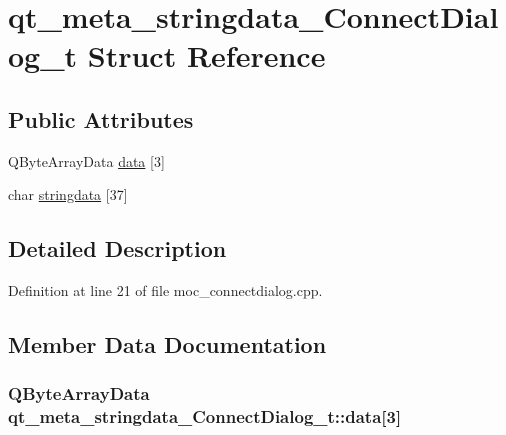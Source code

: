\hypertarget{structqt__meta__stringdata___connect_dialog__t}{}\section{qt\+\_\+meta\+\_\+stringdata\+\_\+\+Connect\+Dialog\+\_\+t Struct Reference}
\label{structqt__meta__stringdata___connect_dialog__t}
\subsection*{Public Attributes}
\begin{DoxyCompactItemize}
\item 
Q\+Byte\+Array\+Data \hyperlink{structqt__meta__stringdata___connect_dialog__t_a229ce996e8ad04acc64a1eccd45d92e9}{data} \mbox{[}3\mbox{]}
\item 
char \hyperlink{structqt__meta__stringdata___connect_dialog__t_ac4488fe4adc309e0d0c6dcb072f5ac8f}{stringdata} \mbox{[}37\mbox{]}
\end{DoxyCompactItemize}


\subsection{Detailed Description}


Definition at line 21 of file moc\+\_\+connectdialog.\+cpp.



\subsection{Member Data Documentation}
\hypertarget{structqt__meta__stringdata___connect_dialog__t_a229ce996e8ad04acc64a1eccd45d92e9}{}
\subsubsection[{data}]{\setlength{\rightskip}{0pt plus 5cm}Q\+Byte\+Array\+Data qt\+\_\+meta\+\_\+stringdata\+\_\+\+Connect\+Dialog\+\_\+t\+::data\mbox{[}3\mbox{]}}\label{structqt__meta__stringdata___connect_dialog__t_a229ce996e8ad04acc64a1eccd45d92e9}


